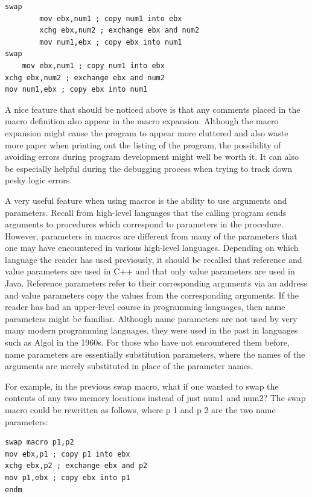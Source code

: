 \documentclass[10pt]{book}
\begin{document}
\begin{center}
\begin{center}
\begin{verbatim}
swap
        mov ebx,num1 ; copy num1 into ebx
        xchg ebx,num2 ; exchange ebx and num2
        mov num1,ebx ; copy ebx into num1
swap
    mov ebx,num1 ; copy num1 into ebx
xchg ebx,num2 ; exchange ebx and num2
mov num1,ebx ; copy ebx into num1
\end{verbatim}

A nice feature that should be noticed above is that any comments placed in the macro definition also appear in the macro expansion. Although the macro expansion might cause the program to appear more cluttered and also waste more paper when printing out the listing of the program, the possibility of avoiding errors during program development might well be worth it. It can also be especially helpful during the debugging process when trying to track down pesky logic errors.

A very useful feature when using macros is the ability to use arguments and parameters. Recall from high-level languages that the calling program sends arguments to procedures which correspond to parameters in the procedure. However, parameters in macros are different from many of the parameters that one may have encountered in various high-level languages. Depending on which language the reader has used previously, it should be recalled that reference and value parameters are used in C++ and that only value parameters are used in Java. Reference parameters refer to their corresponding arguments via an address and value parameters copy the values from the corresponding arguments. If the reader has had an upper-level course in programming languages, then name parameters might be familiar. Although name parameters are not used by very many modern programming languages, they were used in the past in languages such as Algol in the 1960s. For those who have not encountered them before, name parameters are essentially substitution parameters, where the names of the arguments are merely substituted in place of the parameter names.

For example, in the previous swap macro, what if one wanted to swap the contents of any two memory locations instead of just num1 and num2? The swap macro could be rewritten as follows, where p 1 and p 2 are the two name parameters:

\begin{verbatim}
swap macro p1,p2
mov ebx,p1 ; copy p1 into ebx
xchg ebx,p2 ; exchange ebx and p2
mov p1,ebx ; copy ebx into p1
endm
\end{verbatim}


\end{center}
\end{center}
\end{document}
